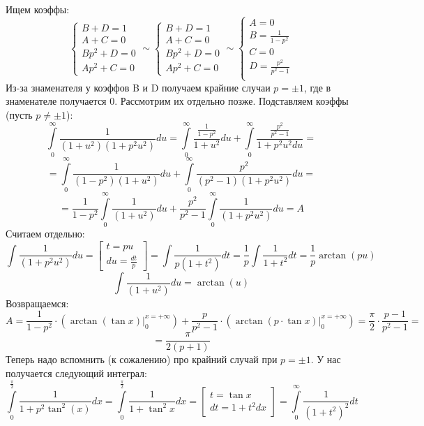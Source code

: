\documentclass[a4paper,12pt]{article}
\begin{document}
Ищем коэффы:
\[
\begin{cases}
B + D = 1 \\
A + C = 0\\
Bp^2 + D = 0 \\
Ap^2 + C = 0 
\end{cases}
\sim
\begin{cases}
B + D = 1 \\
A + C = 0\\
Bp^2 + D = 0 \\
Ap^2 + C = 0 
\end{cases} 
\sim
\begin{cases}
A = 0 \\
B = \frac{1}{1 - p^2} \\
C = 0 \\
D = \frac{p^2}{p^2 - 1} \\
\end{cases}
\]
Из-за знаменателя у коэффов B и D получаем крайние случаи $p = \pm 1 $, где в знаменателе получается 0. Рассмотрим их отдельно позже. Подставляем коэффы (пусть $p \neq \pm 1$):
\[
\int\limits_0^{\infty} \frac{1}{(1 + u^2) (1 + p^2 u^2)} du = 
\int\limits_0^{\infty}  \frac{\frac{1}{1 - p^2}}{1 + u^2}du+ \int\limits_0^{\infty}  \frac{\frac{p^2}{p^2 - 1}}{1 +p^2u^2du} = 
\]
\[
=
\int\limits_0^{\infty}  \frac{1}{(1 - p^2)(1 + u^2)}du + \int\limits_0^{\infty}  \frac{p^2}{(p^2 - 1)(1 +p^2u^2)}du = 
\]
\[
=
\frac{1}{1-p^2} \int\limits_0^{\infty} \frac{1}{(1 + u^2)}du + 
\frac{p^2}{p^2-1}\int\limits_0^{\infty}  \frac{1}{(1 +p^2
u^2)}du = A 
\]
Считаем отдельно:
\[
\int \frac{1}{ (1+ p^2u^2)} du = 
\begin{bmatrix}
t = pu \\
du = \frac{dt}{p}
\end{bmatrix}
=
\int \frac{1}{p(1 + t^2)} dt
=
\frac{1}{p} \int \frac{1}{1 + t^2} dt = \frac{1}{p} \arctan (pu)
\]
\[
\int \frac{1}{ (1+ u^2)} du = \arctan(u)
\]
Возвращаемся:
\[
A = 
\frac{1}{1-p^2} \cdot \left( \arctan (\tan x) \Bigg|^{x=+\infty}_0 \right)+ \frac{p}{p^2 - 1} \cdot \left( \arctan (p \cdot \tan x) 
\Bigg|^{x=+\infty}_0 \right) 
=
\frac{\pi}{2} \cdot 
\frac{p-1}{p^2 - 1}
=
\]
\[
=
\frac{\pi}{2(p+1)}
\]
Теперь надо вспомнить (к сожалению) про крайний случай при $p = \pm 1$. У нас получается следующий интеграл:
\[
\int\limits_0^{\frac{\pi}{2}} \frac{1}{1 + p^2 \tan^2 (x)} dx  =
\int\limits_0^{\frac{\pi}{2}} \frac{1}{1 + \tan^2 x} dx =
\begin{bmatrix}
t = \tan x \\
dt = 1 + t^2 dx
\end{bmatrix}
=
\int\limits_0^{\infty} \frac{1}{(1 + t^2)^2} dt
\]
\end{document}

